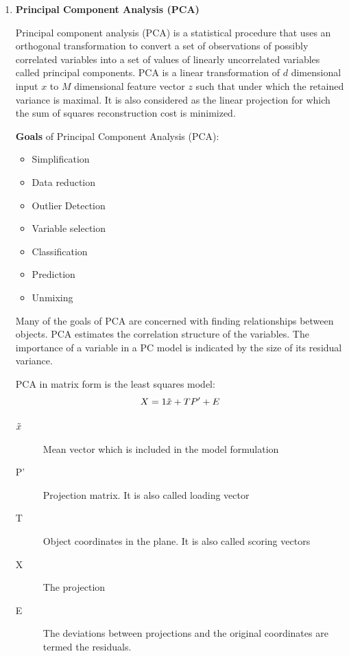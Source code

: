 \begin{enumerate}
    \item \textbf{Principal Component Analysis (PCA)}
    
    Principal component analysis (PCA) is a statistical procedure that uses an orthogonal transformation to convert a set of observations of possibly correlated variables into a set of values of linearly uncorrelated variables called principal components. PCA is a linear transformation of $d$ dimensional input $x$ to $M$ dimensional feature vector $z$ such that under which the retained variance is maximal. It is also considered as the linear projection for which the sum of squares reconstruction cost is minimized. 
    
    
    \textbf{Goals} of Principal Component Analysis (PCA):
    \begin{itemize}
        \item Simplification
        \item Data reduction
        \item Outlier Detection
        \item Variable selection
        \item Classification
        \item Prediction
        \item Unmixing
    \end{itemize}
    
    
    Many of the goals of PCA are concerned with finding relationships between objects. PCA estimates the correlation structure of the variables. The importance of a variable in a PC model is indicated by the size of its residual variance. 

    
    PCA \cite{BIB14} in matrix form is the least squares model:
    \begin{equation}
        X = 1\Tilde{x} + TP' + E
    \end{equation}
    \begin{description}
        \item [$\Tilde{x}$] Mean vector which is included in the model formulation
        \item [P'] Projection matrix. It is also called loading vector
        \item [T] Object coordinates in the plane. It is also called scoring vectors
        \item [X] The projection
        \item [E] The deviations between projections and the original coordinates are termed the residuals.
    \end{description}
    

\end{enumerate}
